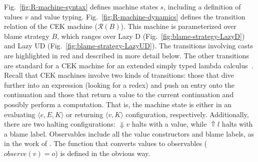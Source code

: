 \documentclass[runningheads]{llncs}
\newcommand{\RMachine}[1]{\ensuremath{\mathcal{R}(#1)}}
\newcommand{\error}[1]{\ensuremath{\Uparrow#1}}
\newcommand{\sexpr}[3]{\ensuremath{\langle#1,#2,#3\rangle}}
\newcommand{\scont}[2]{\ensuremath{\langle#1,#2\rangle}}
\newcommand{\shalt}[1]{\ensuremath{\Downarrow #1}}
\begin{document}
Fig.~\ref{fig:R-machine-syntax} defines machine 
states $s$, including a definition of values $v$ and value typing.
Fig.~\ref{fig:R-machine-dynamics} defines the transition relation of the CEK
machine (\RMachine{B}). 
%
This machine is parameterized over blame strategy $B$, which ranges over
Lazy D (Fig.~\ref{fig:blame-strategy-LazyD}) and Lazy UD 
(Fig.~\ref{fig:blame-strategy-LazyUD}).
%
The transitions involving casts are highlighted in red and described in
more detail below. The other transitions are standard for a CEK
machine for an extended simply typed lambda calculus~\citep{Felleisen:2009aa}.
%
Recall that CEK machines involve two kinds of transitions: those that
dive further into an expression (looking for a redex) and push an
entry onto the continuation and those that return a value to the
current continuation and possibly perform a computation.  That is, the
machine state is either in an evaluating $\sexpr{e}{E}{K}$ or
returning $\scont{v}{K}$ configuration, respectively. Additionally,
there are two halting configurations: \shalt{v} halts with a value,
while \error{l} halts with a blame label.  Observables include all the
value constructors and blame labels, as in the work of
\citet{siek2012interpretations}.  The function that converts values to
observables ($observe(v) = o$) is defined in the obvious way.
\end{document}
